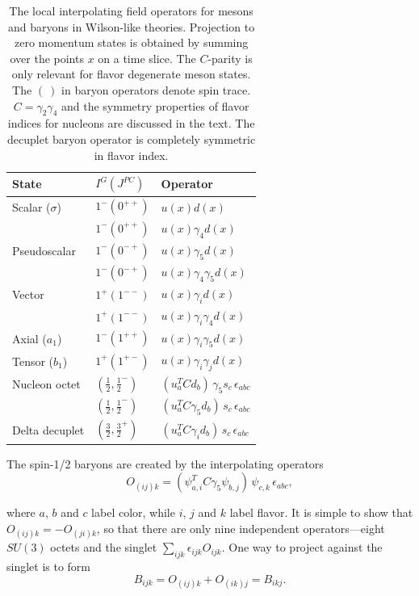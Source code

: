 \begin{table}[htbp]
\centering
\begin{tabular}{lll}
\toprule
State & $I^G(J^{PC})$ & Operator \\
\midrule
Scalar ($\sigma$) & $1^-(0^{++})$ & $u(x)d(x)$ \\
                  & $1^-(0^{++})$ & $u(x)\gamma_4 d(x)$ \\
Pseudoscalar      & $1^-(0^{-+})$ & $u(x)\gamma_5 d(x)$ \\
                  & $1^-(0^{-+})$ & $u(x)\gamma_4\gamma_5 d(x)$ \\
Vector            & $1^+(1^{--})$ & $u(x)\gamma_i d(x)$ \\
                  & $1^+(1^{--})$ & $u(x)\gamma_i\gamma_4 d(x)$ \\
Axial ($a_1$)     & $1^-(1^{++})$ & $u(x)\gamma_i\gamma_5 d(x)$ \\
Tensor ($b_1$)    & $1^+(1^{+-})$ & $u(x)\gamma_i\gamma_j d(x)$ \\
\midrule
Nucleon octet     & $(\tfrac{1}{2},\tfrac{1}{2}^-)$ & $(u_a^T C d_b)\,\gamma_5 s_c\,\epsilon_{abc}$ \\
                  & $(\tfrac{1}{2},\tfrac{1}{2}^-)$ & $(u_a^T C\gamma_5 d_b)\,s_c\,\epsilon_{abc}$ \\
Delta decuplet    & $(\tfrac{3}{2},\tfrac{3}{2}^+)$ & $(u_a^T C\gamma_i d_b)\,s_c\,\epsilon_{abc}$ \\
\bottomrule
\end{tabular}
\caption{The local interpolating field operators for mesons and baryons in
Wilson-like theories.  Projection to zero momentum states is obtained by
summing over the points $x$ on a time slice.  The $C$-parity is only relevant
for flavor degenerate meson states.  The $(\ )$ in baryon operators denote
spin trace.  $C = \gamma_2\gamma_4$ and the symmetry properties of flavor
indices for nucleons are discussed in the text.  The decuplet baryon operator
is completely symmetric in flavor index.}
\label{tab:8}
\end{table}

The spin-1/2 baryons are created by the interpolating operators
\begin{equation}
O_{(ij)k} = (\psi_{a,i}^T C\gamma_5 \psi_{b,j})\,\psi_{c,k}\,\epsilon_{abc} ,
\end{equation}

where $a$, $b$ and $c$ label color, while $i$, $j$ and $k$ label flavor.  It
is simple to show that $O_{(ij)k} = -O_{(ji)k}$, so that there are only nine
independent operators---eight $SU(3)$ octets and the singlet
$\sum_{ijk}\epsilon_{ijk}O_{ijk}$.  One way to project against the singlet is
to form
\begin{equation}
B_{ijk} = O_{(ij)k} + O_{(ik)j} = B_{ikj} .
\end{equation}

